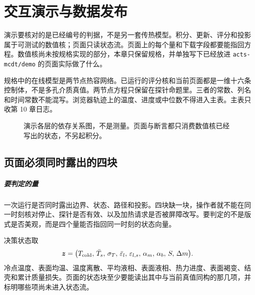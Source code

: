 \chapter{交互演示与数据发布}
\label{ch:demo}

演示要核对的是已经编号的判据，不是另一套传热模型。积分、更新、评分和投影属于可测试的数值核；页面只读状态流。页面上的每个量和下载字段都要能指回方程。数值核尚未按规格实现的部分，本章只保留规格，并单独写下已经放进 \texttt{acts-mcdt/demo} 的页面实际做了什么。

规格中的在线模型是两节点热容网络。已运行的评分核和当前页面都是一维十六条控制体，不是多孔介质真值。两节点方程只保留在探针命题里。三者的常数、列名和时间常数不能混写。浏览器轨迹上的温度、进度或中位数不得进入主表。主表只收第 10 章日志。

\begin{figure}[ht]
\centering
{}
\caption{演示各层的依存关系图，不是测量。页面与断言都只消费数值核已经写出的状态，不另起积分。}
\end{figure}

\section{页面必须同时露出的四块}

\paragraph{要判定的量}
一次运行是否同时露出边界、状态、路径和投影。四块缺一块，操作者就不能在同一时刻核对停止、探针是否有效、以及加热请求是否被屏障改写。要判定的不是版式是否美观，而是四个量能否指回同一时刻的状态向量。

决策状态取
\[
\bm{z}=\big(T_{\mathrm{cold}},\,\bar T_s,\,\sigma_T,\,\bar\varepsilon_l,\,\varepsilon_{l,s},\,\alpha_m,\,\alpha_b,\,S,\,\Delta m\big).
\]
冷点温度、表面均温、温度离散、平均液相、表面液相、热力进度、表面褐变、结壳和累计质量损失。页面的状态块至少要能读出其中与当前真值同构的那几项，并标明哪些项尚未进入状态流。

